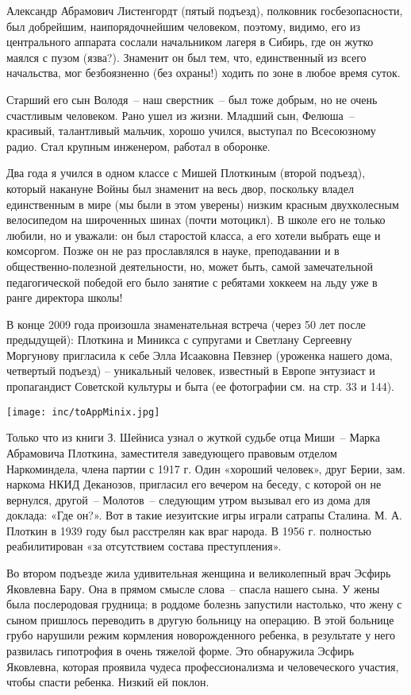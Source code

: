 \indent

Александр Абрамович Листенгордт (пятый подъезд), полковник госбезопасности, был добрейшим, наипорядочнейшим человеком, поэтому, видимо, его из центрального аппарата  сослали начальником лагеря  в Сибирь, где он жутко маялся с пузом (язва?). Знаменит он был тем, что, единственный из всего начальства, мог безбоязненно (без охраны!) ходить по зоне в любое время суток.


Старший его сын Володя~-- наш сверстник~-- был тоже добрым, но не очень счастливым человеком. Рано ушел из жизни. Младший сын, Фелюша~--  красивый, талантливый мальчик, хорошо учился, выступал по Всесоюзному радио. Стал крупным инженером, работал в оборонке.

\indent

Два года я учился в одном классе с Мишей Плоткиным (второй подъезд), который накануне Войны был знаменит на весь двор, поскольку владел единственным в мире (мы были в этом уверены) низким красным двухколесным велосипедом на широченных шинах (почти мотоцикл). В школе его не только любили, но и уважали: он был старостой класса, а его хотели выбрать еще и комсоргом. Позже он не раз прославлялся в науке, преподавании и в общественно-полезной деятельности, но, может быть, самой замечательной педагогической победой его было занятие с ребятами хоккеем на льду уже в ранге директора школы!

В конце 2009 года произошла знаменательная встреча (через 50 лет после предыдущей): Плоткина и Миникса с супругами и Светлану Сергеевну Моргунову пригласила к себе Элла Исааковна Певзнер (уроженка нашего дома, четвертый подъезд) – уникальный человек, известный в Европе энтузиаст и пропагандист Советской культуры и быта (ее фотографии см. на стр. 33 и 144).


\noindent\texttt{[image: inc/toAppMinix.jpg]}

Только что из книги З. Шейниса узнал о жуткой судьбе отца Миши~-- Марка Абрамовича Плоткина, заместителя заведующего правовым отделом Наркоминдела, члена партии с 1917 г. Один «хороший человек», друг Берии, зам. наркома НКИД Деканозов, пригласил его вечером на беседу, с которой он не вернулся, другой~-- Молотов~-- следующим утром вызывал его из дома для доклада: «Где он?». Вот в такие иезуитские игры играли сатрапы Сталина. М. А. Плоткин в 1939 году был расстрелян как враг народа. В 1956 г. полностью реабилитирован «за отсутствием состава преступления».  

\indent

Во втором подъезде жила удивительная женщина и великолепный врач Эсфирь Яковлевна Бару. Она в прямом смысле слова~-- спасла нашего сына. У жены была послеродовая грудница; в роддоме болезнь запустили настолько, что жену с сыном пришлось переводить в другую больницу на операцию. В этой больнице грубо нарушили режим кормления новорожденного ребенка, в результате у него развилась гипотрофия в очень тяжелой форме. Это обнаружила Эсфирь Яковлевна, которая проявила чудеса профессионализма и человеческого участия, чтобы спасти ребенка. Низкий ей поклон.

